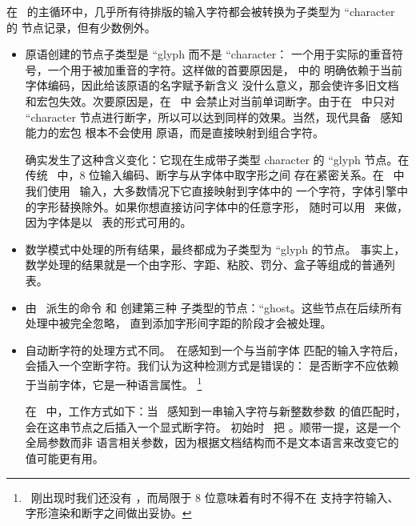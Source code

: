 
在 \LUATEX\ 的主循环中，几乎所有待排版的输入字符都会被转换为子类型为
``character 的  节点记录，但有少数例外。

\begin{itemize}

\item {} 原语创建的节点子类型是 ``glyph 而不是 ``character：
    一个用于实际的重音符号，一个用于被加重音的字符。这样做的首要原因是，
     中的  明确依赖于当前字体编码，因此给该原语的名字赋予新含义
    没什么意义，那会使许多旧文档和宏包失效。次要原因是，在 \ 中
     会禁止对当前单词断字。由于在 \LUATEX\ 中只对 ``character
    节点进行断字，所以可以达到同样的效果。当然，现代具备 \UNICODE\ 感知能力的宏包
    根本不会使用  原语，而是直接映射到组合字符。

     确实发生了这种含义变化：它现在生成带子类型 character 的
    ``glyph 节点。在传统 \TEX\ 中，8 位输入编码、断字与从字体中取字形之间
    存在紧密关系。在 \LUATEX\ 中我们使用 \UTF\ 输入，大多数情况下它直接映射到字体中的
    一个字符，字体引擎中的字形替换除外。如果你想直接访问字体中的任意字形，
    随时可以用 \LUA\ 来做，因为字体是以 \LUA\ 表的形式可用的。

\item 数学模式中处理的所有结果，最终都成为子类型为 ``glyph 的节点。
    事实上，数学处理的结果就是一个由字形、字距、粘胶、罚分、盒子等组成的普通列表。

\item 由 \ALEPH\ 派生的命令  和  创建第三种
    子类型的节点：``ghost。这些节点在后续所有处理中被完全忽略，
    直到添加字形间字距的阶段才会被处理。

\item 自动断字符的处理方式不同。\ 在感知到一个与当前字体 
    匹配的输入字符后，会插入一个空断字符。我们认为这种检测方式是错误的：
    是否断字不应依赖于当前字体，它是一种语言属性。
    \footnote {\TEX\ 刚出现时我们还没有 \UNICODE，而局限于 8 位意味着有时不得不在
    支持字符输入、字形渲染和断字之间做出妥协。}

    在 \LUATEX\ 中，工作方式如下：当 \LUATEX\ 感知到一串输入字符与新整数参数
     的值匹配时，会在这串节点之后插入一个显式断字符。
    初始时 \TEX\ 把 。顺带一提，这是一个全局参数而非
    语言相关参数，因为根据文档结构而不是文本语言来改变它的值可能更有用。


\end{itemize}
